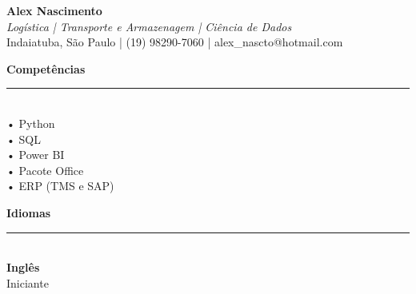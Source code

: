 \documentclass[10pt,a4paper]{article}
\begin{document}
\begin{center}
    {\Huge \textbf{\color{primarycolor}Alex Nascimento}} \\
    \vspace{1mm}
    {\large \textit{Logística | Transporte e Armazenagem | Ciência de Dados}} \\
    \vspace{2mm}
    \small Indaiatuba, São Paulo | (19) 98290-7060 | alex_nascto@hotmail.com
\end{center}

\vspace{4mm}

\begin{minipage}[t]{0.33\textwidth}
    \raggedright
    
    {\color{primarycolor}\large \textbf{Competências}} \\
    \rule{\linewidth}{0.5pt} \\
    \vspace{1mm}
            • Python \\
            • SQL \\
            • Power BI \\
            • Pacote Office \\
            • ERP (TMS e SAP) \\
        
    \vspace{5mm}
    
    {\color{primarycolor}\large \textbf{Idiomas}} \\
    \rule{\linewidth}{0.5pt} \\
    \vspace{1mm}
            \textbf{Inglês} \\
        \small Iniciante \\
        \vspace{1mm}
    \end{minipage}
\hfill
\begin{minipage}[t]{0.02\textwidth}
    \hfill
\end{minipage}
\hfill
\end{document}
